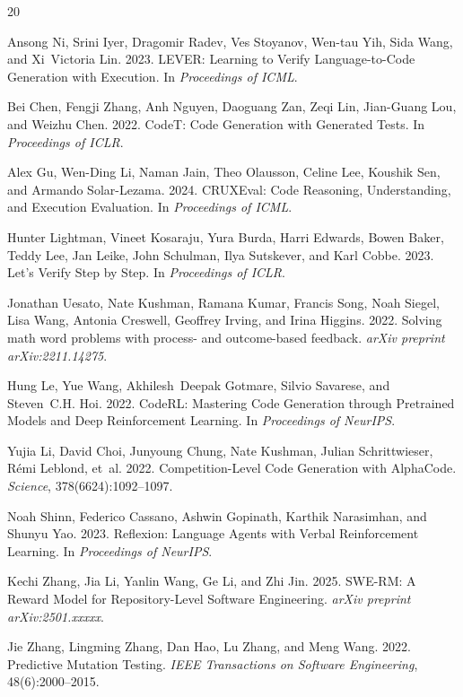 \documentclass[11pt]{article}
\begin{document}


\begin{thebibliography}{20}

Ansong Ni, Srini Iyer, Dragomir Radev, Ves Stoyanov, Wen-tau Yih, Sida Wang, and Xi~Victoria Lin. 2023.
\newblock LEVER: Learning to Verify Language-to-Code Generation with Execution.
\newblock In \emph{Proceedings of ICML}.

Bei Chen, Fengji Zhang, Anh Nguyen, Daoguang Zan, Zeqi Lin, Jian-Guang Lou, and Weizhu Chen. 2022.
\newblock CodeT: Code Generation with Generated Tests.
\newblock In \emph{Proceedings of ICLR}.

Alex Gu, Wen-Ding Li, Naman Jain, Theo Olausson, Celine Lee, Koushik Sen, and Armando Solar-Lezama. 2024.
\newblock CRUXEval: Code Reasoning, Understanding, and Execution Evaluation.
\newblock In \emph{Proceedings of ICML}.

Hunter Lightman, Vineet Kosaraju, Yura Burda, Harri Edwards, Bowen Baker, Teddy Lee, Jan Leike, John Schulman, Ilya Sutskever, and Karl Cobbe. 2023.
\newblock Let's Verify Step by Step.
\newblock In \emph{Proceedings of ICLR}.

Jonathan Uesato, Nate Kushman, Ramana Kumar, Francis Song, Noah Siegel, Lisa Wang, Antonia Creswell, Geoffrey Irving, and Irina Higgins. 2022.
\newblock Solving math word problems with process- and outcome-based feedback.
\newblock \emph{arXiv preprint arXiv:2211.14275}.

Hung Le, Yue Wang, Akhilesh~Deepak Gotmare, Silvio Savarese, and Steven~C.H. Hoi. 2022.
\newblock CodeRL: Mastering Code Generation through Pretrained Models and Deep Reinforcement Learning.
\newblock In \emph{Proceedings of NeurIPS}.

Yujia Li, David Choi, Junyoung Chung, Nate Kushman, Julian Schrittwieser, R{\'e}mi Leblond, et~al. 2022.
\newblock Competition-Level Code Generation with AlphaCode.
\newblock \emph{Science}, 378(6624):1092--1097.

Noah Shinn, Federico Cassano, Ashwin Gopinath, Karthik Narasimhan, and Shunyu Yao. 2023.
\newblock Reflexion: Language Agents with Verbal Reinforcement Learning.
\newblock In \emph{Proceedings of NeurIPS}.

Kechi Zhang, Jia Li, Yanlin Wang, Ge Li, and Zhi Jin. 2025.
\newblock SWE-RM: A Reward Model for Repository-Level Software Engineering.
\newblock \emph{arXiv preprint arXiv:2501.xxxxx}.

Jie Zhang, Lingming Zhang, Dan Hao, Lu Zhang, and Meng Wang. 2022.
\newblock Predictive Mutation Testing.
\newblock \emph{IEEE Transactions on Software Engineering}, 48(6):2000--2015.

\end{thebibliography}
\end{document}
